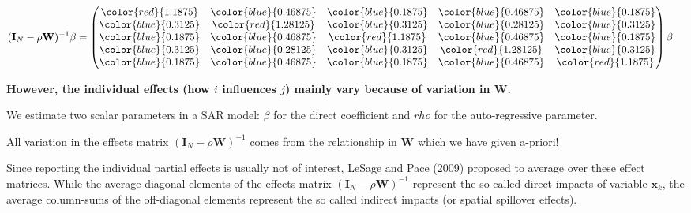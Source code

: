 \documentclass[
  letterpaper,
  DIV=11,
  numbers=noendperiod]{scrreprt}
\begin{document}
\[
\begin{split}
(\boldsymbol{\mathbf{I}}_N - \rho \boldsymbol{\mathbf{W}})^{-1} \beta &=
\begin{pmatrix}
      \color{red}{1.1875} & \color{blue}{0.46875} & \color{blue}{0.1875} & \color{blue}{0.46875} & \color{blue}{0.1875} \\
      \color{blue}{0.3125} & \color{red}{1.28125} & \color{blue}{0.3125} & \color{blue}{0.28125} & \color{blue}{0.3125} \\
      \color{blue}{0.1875} & \color{blue}{0.46875} & \color{red}{1.1875} & \color{blue}{0.46875} & \color{blue}{0.1875} \\
      \color{blue}{0.3125} & \color{blue}{0.28125} & \color{blue}{0.3125} & \color{red}{1.28125} & \color{blue}{0.3125} \\
      \color{blue}{0.1875} & \color{blue}{0.46875} & \color{blue}{0.1875} & \color{blue}{0.46875} & \color{red}{1.1875}
      \end{pmatrix} \beta
\end{split}
\]

\textbf{However, the individual effects (how \(i\) influences \(j\))
mainly vary because of variation in \({\boldsymbol{\mathbf{W}}}\). }

\begin{tcolorbox}[enhanced jigsaw, opacitybacktitle=0.6, left=2mm, leftrule=.75mm, toptitle=1mm, breakable, colback=white, bottomrule=.15mm, colframe=quarto-callout-warning-color-frame, colbacktitle=quarto-callout-warning-color!10!white, coltitle=black, bottomtitle=1mm, titlerule=0mm, title=\textcolor{quarto-callout-warning-color}{\faExclamationTriangle}\hspace{0.5em}{Do not interpret these as ``estimated'' individual impacts}, opacityback=0, arc=.35mm, rightrule=.15mm, toprule=.15mm]

We estimate two scalar parameters in a SAR model: \(\beta\) for the
direct coefficient and \(rho\) for the auto-regressive parameter.

All variation in the effects matrix
\((\boldsymbol{\mathbf{I}}_N - \rho \boldsymbol{\mathbf{W}})^{-1}\)
\beta comes from the relationship in \(\boldsymbol{\mathbf{W}}\) which
we have given a-priori!

\end{tcolorbox}

Since reporting the individual partial effects is usually not of
interest, LeSage and Pace (2009) proposed to average over these effect
matrices. While the average diagonal elements of the effects matrix
\((\boldsymbol{\mathbf{I}}_N - \rho \boldsymbol{\mathbf{W}})^{-1}\)
represent the so called direct impacts of variable
\({\boldsymbol{\mathbf{x}}}_k\), the average column-sums of the
off-diagonal elements represent the so called indirect impacts (or
spatial spillover effects).
\end{document}
